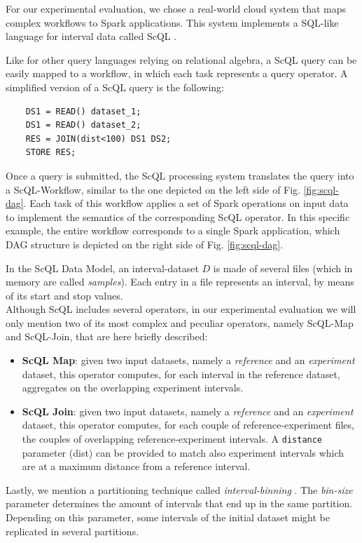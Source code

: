 \documentclass[a4paper, 10pt, conference]{ieeeconf}      %
\begin{document}
\noindent 
For our experimental evaluation, we chose a real-world cloud system that maps complex workflows to Spark applications.  This system implements a SQL-like language for interval data called ScQL \cite{ScQL,gmql}.

Like for other query languages relying on relational algebra, a ScQL query can be easily mapped to a workflow, in which each task represents a query operator.
A simplified version of a ScQL query is the following:
\begin{verbatim}
    DS1 = READ() dataset_1;
    DS1 = READ() dataset_2;
    RES = JOIN(dist<100) DS1 DS2; 
    STORE RES;
\end{verbatim}
Once a query is submitted, the ScQL processing system translates the query into a ScQL-Workflow, similar to the one depicted on the left side of Fig. \ref{fig:scql-dag}.
Each task of this workflow applies a set of Spark operations on input data to implement the semantics of the corresponding ScQL operator. In this specific example, the entire workflow corresponds to a single Spark application, which DAG structure is depicted on the right side of Fig. \ref{fig:scql-dag}.

In the ScQL Data Model, an interval-dataset $D$ is made of several files (which in memory are called \textit{samples}). Each entry in a file represents an interval, by means of its start and stop values.\\
Although ScQL includes several operators, in our experimental evaluation we will only mention two of its most complex and peculiar operators, namely ScQL-Map and ScQL-Join, that are here briefly described: 
\begin{itemize}
    \item \textbf{ScQL Map}: given two input datasets,  namely a \textit{reference} and an \textit{experiment} dataset, this operator computes, for each interval in the reference dataset, aggregates on the overlapping experiment intervals. 
    \item \textbf{ScQL Join}: given two input datasets, namely a \textit{reference} and an \textit{experiment} dataset, this operator computes, for each couple of reference-experiment files, the couples of overlapping reference-experiment intervals.  A \texttt{distance} parameter (dist) can be provided to match also experiment intervals which are at a maximum distance from a reference interval. 
\end{itemize}
Lastly, we mention a partitioning technique called \textit{interval-binning} \cite{binning}. The \textit{bin-size} parameter determines the amount of intervals that end up in the same partition. Depending on this parameter, some intervals of the initial dataset might be replicated in several partitions.
\end{document}
